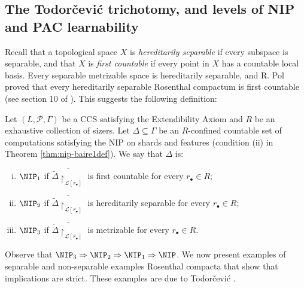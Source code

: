 \subsection{The Todorčević trichotomy, and levels of NIP and PAC learnability}\label{sec:trichotomy}
Recall that a topological space $X$ is \emph{hereditarily separable} if every subspace is separable, and that $X$ is \emph{first countable} if every point in $X$ has a countable local basis.
Every separable metrizable space is hereditarily separable, and R.
Pol proved that every hereditarily separable Rosenthal compactum is first countable (see section 10 of \cite{debs2013rosenthal}).
This suggests the following definition:

\begin{definition}
    Let $(L,\mathcal{P},\Gamma)$ be a CCS satisfying the Extendibility Axiom and $R$ be an exhaustive collection of sizers.
Let $\Delta\subseteq\Gamma$ be an $R$-confined countable set of computations satisfying the NIP on shards and features (condition (ii) in Theorem \ref{thm:nip-baire1def}).
We say that $\Delta$ is:
    \begin{enumerate}[(i)]
        \item
        $\NIP_1$ if $\overline{\tilde\Delta\restriction_{\mathcal{L}[r_\bullet]}}$ is first countable for every $r_\bullet\in R$;
        \item
        $\NIP_2$ if $\overline{\tilde\Delta\restriction_{\mathcal{L}[r_\bullet]}}$ is hereditarily separable for every $r_\bullet\in R$;
        \item
        $\NIP_3$ if $\overline{\tilde\Delta\restriction_{\mathcal{L}[r_\bullet]}}$ is metrizable for every $r_\bullet\in R$.
    \end{enumerate}
\end{definition}

Observe that $\NIP_3 \Rightarrow \NIP_2\Rightarrow \NIP_1\Rightarrow \NIP$.
We now present examples of separable and non-separable examples Rosenthal compacta that show that implications are strict.
These examples are due to Todorčević \cite{Todorcevic_1999_CompactSubsetsBaire}.

